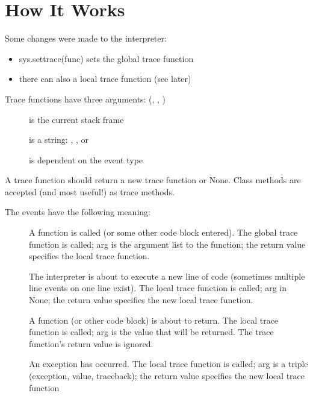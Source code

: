 \section{How It Works}

Some changes were made to the interpreter:

\begin{itemize}
\item sys.settrace(func) sets the global trace function
\item there can also a local trace function (see later)
\end{itemize}

Trace functions have three arguments: (, , )

\begin{description}

\item[] is the current stack frame

\item[] is a string: , , 
or 

\item[] is dependent on the event type

\end{description}

A trace function should return a new trace function or None.
Class methods are accepted (and most useful!) as trace methods.

The events have the following meaning:

\begin{description}

\item[]
A function is called (or some other code block entered).  The global
trace function is called; arg is the argument list to the function;
the return value specifies the local trace function.

\item[]
The interpreter is about to execute a new line of code (sometimes
multiple line events on one line exist).  The local trace function is
called; arg in None; the return value specifies the new local trace
function.

\item[]
A function (or other code block) is about to return.  The local trace
function is called; arg is the value that will be returned.  The trace
function's return value is ignored.

\item[]
An exception has occurred.  The local trace function is called; arg is
a triple (exception, value, traceback); the return value specifies the
new local trace function

\end{description}


